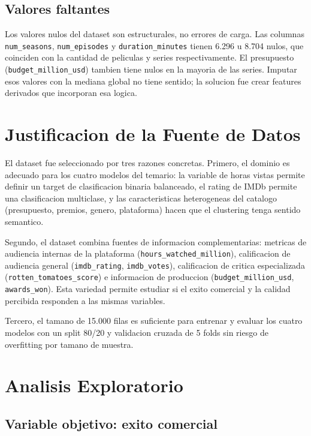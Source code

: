 \documentclass[12pt, a4paper]{article}
\begin{document}
\subsection{Valores faltantes}

Los valores nulos del dataset son estructurales, no errores de carga. Las columnas \texttt{num\_seasons}, \texttt{num\_episodes} y \texttt{duration\_minutes} tienen 6.296 u 8.704 nulos, que coinciden con la cantidad de peliculas y series respectivamente. El presupuesto (\texttt{budget\_million\_usd}) tambien tiene nulos en la mayoria de las series. Imputar esos valores con la mediana global no tiene sentido; la solucion fue crear features derivados que incorporan esa logica.

\section{Justificacion de la Fuente de Datos}

El dataset fue seleccionado por tres razones concretas. Primero, el dominio es adecuado para los cuatro modelos del temario: la variable de horas vistas permite definir un target de clasificacion binaria balanceado, el rating de IMDb permite una clasificacion multiclase, y las caracteristicas heterogeneas del catalogo (presupuesto, premios, genero, plataforma) hacen que el clustering tenga sentido semantico.

Segundo, el dataset combina fuentes de informacion complementarias: metricas de audiencia internas de la plataforma (\texttt{hours\_watched\_million}), calificacion de audiencia general (\texttt{imdb\_rating}, \texttt{imdb\_votes}), calificacion de critica especializada (\texttt{rotten\_tomatoes\_score}) e informacion de produccion (\texttt{budget\_million\_usd}, \texttt{awards\_won}). Esta variedad permite estudiar si el exito comercial y la calidad percibida responden a las mismas variables.

Tercero, el tamano de 15.000 filas es suficiente para entrenar y evaluar los cuatro modelos con un split 80/20 y validacion cruzada de 5 folds sin riesgo de overfitting por tamano de muestra.

\section{Analisis Exploratorio}

\subsection{Variable objetivo: exito comercial}
\end{document}
